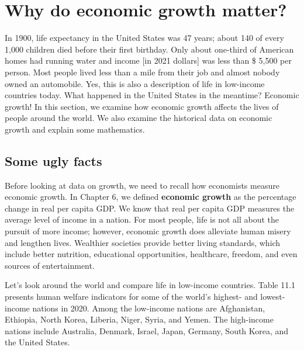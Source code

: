\documentclass[11pt]{article} %
\begin{document}
\section*{Why do economic growth matter?}
In 1900, life expectancy in the United States was 47 years; about 140 of every 1,000 children died before their first birthday. Only about one-third of American homes had running water and income [in 2021 dollars] was less than \$ 5,500 per person. Most people lived less than a mile from their job and almost nobody owned an automobile. Yes, this is also a description of life in low-income countries today. What happened in the United States in the meantime? Economic growth!
In this section, we examine how economic growth affects the lives of people around the world. We also examine the historical data on economic growth and explain some mathematics.
\subsection*{Some ugly facts}
Before looking at data on growth, we need to recall how economists measure economic growth. In Chapter 6, we defined \textbf{economic growth} as the percentage change in real per capita GDP. We know that real per capita GDP measures the average level of income in a nation. For most people, life is not all about the pursuit of more income; however, economic growth does alleviate human misery and lengthen lives. Wealthier societies provide better living standards, which include better nutrition, educational opportunities, healthcare, freedom, and even sources of entertainment.

Let's look around the world and compare life in low-income countries. Table 11.1 presents human welfare indicators for some of the world's highest- and lowest-income nations in 2020. Among the low-income nations are Afghanistan, Ethiopia, North Korea, Liberia, Niger, Syria, and Yemen. The high-income nations include Australia, Denmark, Israel, Japan, Germany, South Korea, and the United States.
\end{document}
